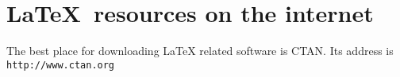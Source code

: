 \documentclass{article}
\begin{document}
\section{\textsf{\LaTeX\  resources on the internet}}
The best place for downloading LaTeX related software is CTAN.
Its address is \texttt{http://www.ctan.org}
\end{document}
